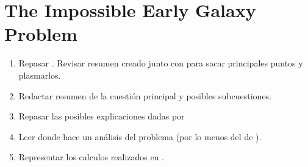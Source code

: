 \section{The Impossible Early Galaxy Problem}


\begin{enumerate}
	\item Repasar \cite{steinhardt2016impossibly}. Revisar resumen creado junto con \cite{arranz2015finkelstein} para sacar principales puntos y plasmarlos. 
	\item Redactar resumen de la cuestión principal y posibles subcuestiones.
	\item Repasar las posibles explicaciones dadas por \cite{steinhardt2016impossibly}
	\item Leer \cite{behroozi2019universemachine} donde hace un análisis del problema (por lo menos del de \cite{finkelstein2015increasing}).
	\item Representar los calculos realizados en \citep{behroozi2019universemachine}.
\end{enumerate}

